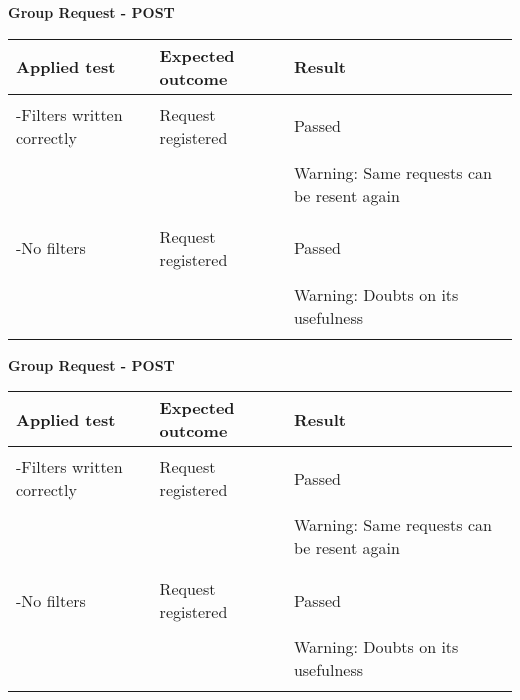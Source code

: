 \textbf{Group Request - POST}
\begin{center}
	\begin{tabular}{|p{}|p{}|p{}|}
		\hline
		Applied test & Expected outcome & Result \\
		\hline
		&&\\
		-Filters written correctly&Request registered&Passed\\
		&&\\
		&&Warning: Same requests can be resent again\\
		&&\\
		\hline
		&&\\
		-No filters &Request registered&Passed\\
		&&\\
		&&Warning: Doubts on its usefulness\\
		&&\\
		\hline
	\end{tabular}
\end{center}
\textbf{Group Request - POST}
\begin{center}
	\begin{tabular}{|p{}|p{}|p{}|}
		\hline
		Applied test & Expected outcome & Result \\
		\hline
		&&\\
		-Filters written correctly&Request registered&Passed\\
		&&\\
		&&Warning: Same requests can be resent again\\
		&&\\
		\hline
		&&\\
		-No filters &Request registered&Passed\\
		&&\\
		&&Warning: Doubts on its usefulness\\
		&&\\
		\hline
	\end{tabular}
\end{center}